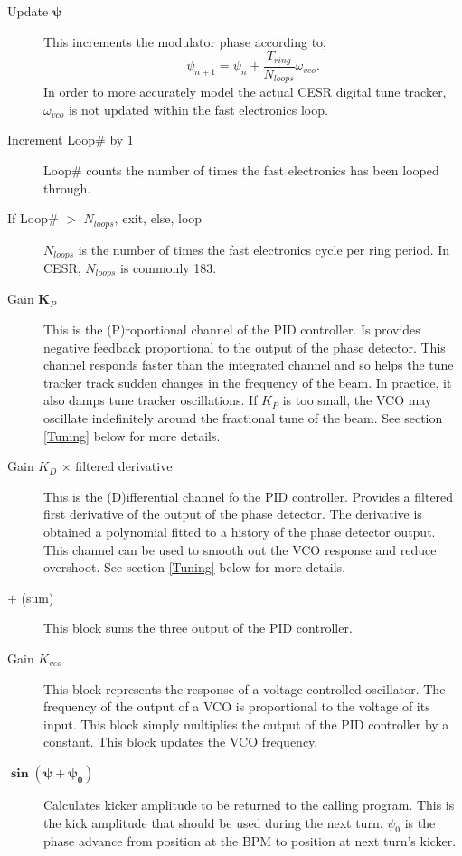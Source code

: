 \begin{description}
\item[Update $\boldsymbol{\psi}$] This increments the modulator phase according to,
\begin{equation}
\psi_{n+1}=\psi_n+\frac{T_{ring}}{N_{loops}}\omega_{vco}\textrm{.}
\end{equation}
In order to more accurately model the actual CESR digital tune tracker, 
$\omega_{vco}$ is not updated within the fast electronics loop.

\item[Increment Loop\# by 1]  Loop\# counts the number of times the fast electronics has been looped through.

\item[If Loop\# $>$ $N_{loops}$, exit, else, loop]  $N_{loops}$ is the number of times the fast electronics 
cycle per ring period.  In CESR, $N_{loops}$ is commonly 183.

\item[Gain $\boldsymbol K_P$] This is the (P)roportional channel of the PID controller.  Is provides
negative feedback proportional to the output of the phase detector.  This channel 
responds faster than the integrated channel and so helps the tune tracker
track sudden changes in the frequency of the beam.  In practice, it also damps tune tracker oscillations.  
If $K_P$ is too small, the VCO may oscillate indefinitely around the fractional tune of the beam.
See section \ref{Tuning} below for more details.

\item[Gain $K_D$ $\times$ filtered derivative]  This is the (D)ifferential channel fo the PID controller.
Provides a filtered first derivative of the output of the phase
detector.  The derivative is obtained a polynomial fitted to a history of the phase detector output.
This channel can be used to smooth out the VCO response and reduce overshoot.  See section \ref{Tuning}
below for more details.

\item[$\boldsymbol +$ (sum)]  This block sums the three output of the PID controller.

\item[Gain $K_{vco}$]  This block represents the response of a voltage controlled oscillator.  The frequency
of the output of a VCO is proportional to the voltage of its input.  This block simply multiplies
the output of the PID controller by a constant.  This block updates the VCO frequency.

\item[$\boldsymbol{\sin\left(\psi+\psi_0\right)}$]  Calculates kicker amplitude to be returned to the calling
program.  This is the kick amplitude that should be used during the next turn.  $\psi_0$ is the phase
advance from position at the BPM to position at next turn's kicker.

\end{description}

